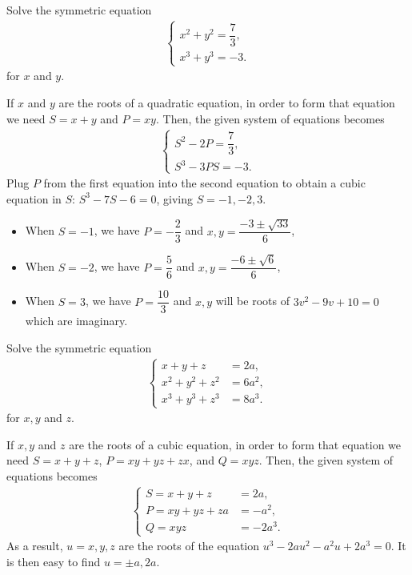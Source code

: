 \documentclass[12pt,a4paper]{memoir}
\theoremstyle{definition}
\begin{document}
\begin{question}
	Solve the symmetric equation
	\begin{align*}
		\begin{cases}
			x^2+y^2=\dfrac{7}{3},\\x^3+y^3=-3.
		\end{cases}
	\end{align*}
	for $x$ and $y$.
\end{question}

\begin{solution}
	If $x$ and $y$ are the roots of a quadratic equation, in order to form that equation we need $S=x+y$ and $P=xy$. Then, the given system of equations becomes
	\begin{align*}
		\begin{cases}
			S^2-2P=\dfrac{7}{3},\\ S^3-3PS = -3.
		\end{cases}
	\end{align*}
	Plug $P$ from the first equation into the second equation to obtain a cubic equation in $S$: $S^3-7S-6=0$, giving $S=-1,-2,3$. 
	\begin{itemize}
		\item When $S=-1$, we have $P=-\dfrac{2}{3}$ and $x,y = \dfrac{-3\pm\sqrt{33}}{6}$,
		\item When $S=-2$, we have $P=\dfrac{5}{6}$ and $x,y = \dfrac{-6\pm\sqrt{6}}{6}$,
		\item When $S=3$, we have $P=\dfrac{10}{3}$ and $x,y$ will be roots of $3v^2-9v+10=0$ which are imaginary.
	\end{itemize}
\end{solution}


\begin{question}
	Solve the symmetric equation
	\begin{align*}
		\begin{cases}
			x+y+z &= 2a,\\ x^2+y^2+z^2 &=6a^2,\\ x^3+y^3+z^3 &= 8a^3.
		\end{cases}
	\end{align*}
	for $x,y$ and $z$.
\end{question}


\begin{solution}
	If $x,y$ and $z$ are the roots of a cubic equation, in order to form that equation we need $S=x+y+z$, $P=xy+yz+zx$, and $Q=xyz$. Then, the given system of equations becomes
	\begin{align*}
		\begin{cases}
			S=x+y+z &= 2a,\\ P=xy+yz+za&=-a^2,\\ Q=xyz &= -2a^3.
		\end{cases}
	\end{align*}
	As a result, $u=x,y,z$ are the roots of the equation $u^3-2au^2-a^2u+2a^3=0$. It is then easy to find $u=\pm a, 2a$.
\end{solution}
\end{document}
